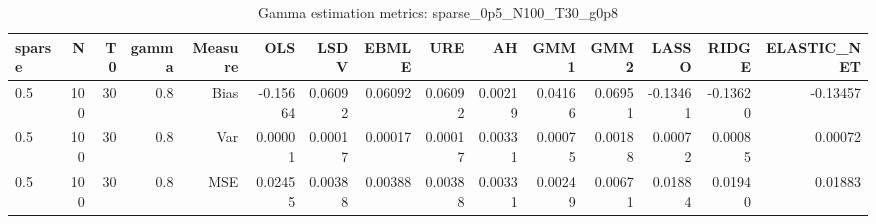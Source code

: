 \begin{table}[!htbp]\centering
\caption{Gamma estimation metrics: sparse_0p5_N100_T30_g0p8}
\label{tab:table1_sparse_0p5_N100_T30_g0p8}
\begin{tabular}{lrrrrrrrrrrrrrr}
\hline
sparse & N & T0 & gamma & Measure & OLS & LSDV & EBMLE & URE & AH & GMM1 & GMM2 & LASSO & RIDGE & ELASTIC_NET \\
\hline
0.5 & 100 & 30 & 0.8 & Bias & -0.15664 & 0.06092 & 0.06092 & 0.06092 & 0.00219 & 0.04166 & 0.06951 & -0.13461 & -0.13620 & -0.13457 \\
0.5 & 100 & 30 & 0.8 & Var & 0.00001 & 0.00017 & 0.00017 & 0.00017 & 0.00331 & 0.00075 & 0.00188 & 0.00072 & 0.00085 & 0.00072 \\
0.5 & 100 & 30 & 0.8 & MSE & 0.02455 & 0.00388 & 0.00388 & 0.00388 & 0.00331 & 0.00249 & 0.00671 & 0.01884 & 0.01940 & 0.01883 \\
\hline
\end{tabular}
\end{table}

